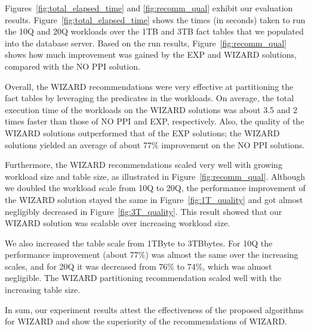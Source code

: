 \documentclass[runningheads]{comsis2}
\begin{document}

Figures~\ref{fig:total_elapsed_time} and \ref{fig:recomm_qual} exhibit our evaluation results.
Figure~\ref{fig:total_elapsed_time} shows the times (in seconds) taken 
to run the 10Q and 20Q workloads over the 1TB and 3TB fact tables that we populated 
into the database server.
Based on the run results, Figure~\ref{fig:recomm_qual} shows 
how much improvement was gained by the EXP and WIZARD solutions, compared with the NO PPI solution. 

Overall, the WIZARD recommendations were very effective at partitioning 
the fact tables by leveraging the predicates in the workloads. 
On average, the \hbox{total} execution time of the workloads on the WIZARD solutions was 
about 3.5 and 2 times faster than those of NO PPI and EXP, respectively. 
Also, the quality of the \hbox{WIZARD} solutions outperformed that of the EXP solutions; 
the WIZARD solutions yielded an average of about 77\% improvement on the NO PPI solutions.  

Furthermore, the WIZARD recommendations 
scaled very well with growing workload size and table size, 
as illustrated in Figure~\ref{fig:recomm_qual}. 
Although we doubled the workload scale from 10Q to 20Q, 
the performance improvement of the WIZARD solution stayed the same in Figure~\ref{fig:1T_quality} 
and got almost negligibly decreased in Figure~\ref{fig:3T_quality}. 
This result showed that our WIZARD \hbox{solution} was scalable over increasing workload size.

We also increased the table scale from 1TByte to 3TBbytes. 
For 10Q the performance improvement (about 77\%) was almost the same over the increasing scales, 
and for 20Q it was decreased from 76\% to 74\%, which was \hbox{almost} negligible.
The WIZARD partitioning \hbox{recommendation} scaled well with the increasing table size.

In sum, our experiment results attest the effectiveness of the proposed algorithms for WIZARD 
and show the superiority of the recommendations of WIZARD.

\end{document}
